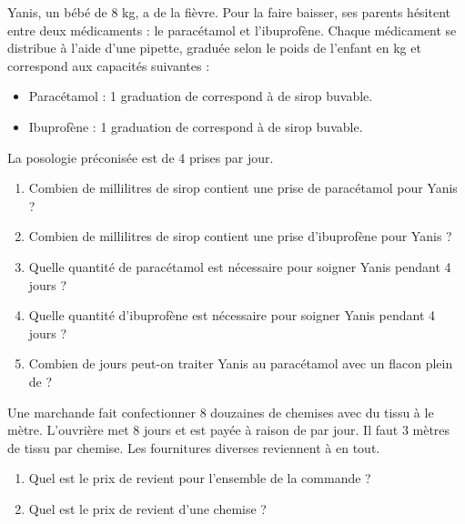 \begin{colonne*exercice}
\begin{exercice}
   Yanis, un bébé de 8 kg, a de la fièvre. Pour la faire baisser, ses parents hésitent entre deux médicaments : le paracétamol et l'ibuprofène. Chaque médicament se distribue à l'aide d'une pipette, graduée selon le poids de l'enfant en kg et correspond aux capacités suivantes :
   \begin{itemize}
      \item Paracétamol : 1 graduation de  correspond à  de sirop buvable.
      \item Ibuprofène : 1 graduation de  correspond à  de sirop buvable.
   \end{itemize}
   La posologie préconisée  est de 4 prises par jour.
   \begin{enumerate}
      \item Combien de millilitres de sirop contient une prise de paracétamol pour Yanis ?
      \item Combien de millilitres de sirop contient une prise d'ibuprofène pour Yanis ?
      \item Quelle quantité de paracétamol est nécessaire pour soigner Yanis pendant 4 jours ?
      \item Quelle quantité d'ibuprofène est nécessaire pour soigner Yanis pendant 4 jours ?
      \item Combien de jours peut-on traiter Yanis au paracétamol avec un flacon plein de  ?
   \end{enumerate}
\end{exercice}

\medskip

\begin{exercice}
   Une marchande fait confectionner 8 douzaines de chemises avec du tissu à  le mètre. L'ouvrière met 8 jours et est payée à raison de  par jour. Il faut 3 mètres de tissu par chemise. Les fournitures diverses reviennent à  en tout.
   \begin{enumerate}
      \item Quel est le prix de revient pour l'ensemble de la commande ?
       \item Quel est le prix de revient d'une chemise ?
    \end{enumerate}
\end{exercice}


\end{colonne*exercice}
